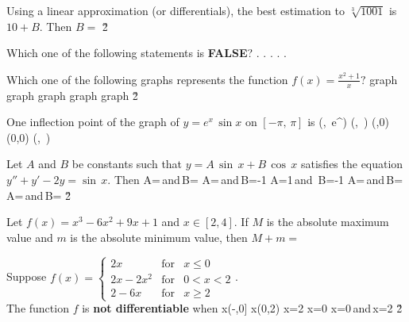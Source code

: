 \documentclass[amsfonts,bezier,leqno,fleqn,12pt,a4paper]{article}
\begin{document}
{{{\begin{large}
\newpage



\item %
Using a linear approximation (or differentials), the best estimation to $\sqrt[3]{1001}$ is $10+B.$ Then $B=$
\sc
\be
\displaystyle {}
\ee
\be
\displaystyle {}
\ee
\be
\displaystyle {}
\ee
\be
\displaystyle {}
\ee
\be
\displaystyle {}
\ee
\v2



\item %
Which one of the following statements is \textbf{FALSE}?
\sc
\be
.
\ee
\be
.
\ee
\be
.
\ee
\be
.
\ee
\be
.
\ee

\newpage



\item %
Which one of the following graphs represents the function $\displaystyle f(x)=\frac{x^{2}+1}{x}?$
\sc
\be
\mbox{graph}
\ee
\be
\mbox{graph}
\ee
\be
\mbox{graph}
\ee
\be
\mbox{graph}
\ee
\be
\mbox{graph}
\ee
\v2



\item %
One inflection point of the graph of $y=e^x\,\sin x$ on $[-\pi,\,\pi]$ is
\sc
\be
\displaystyle \left(,\, e^{}\right)
\ee
\be
\displaystyle \left(,\, \right)
\ee
\be
(\pi,0)
\ee
\be
(0,0)
\ee
\be
\displaystyle \left(,\, \right)
\ee

\newpage



\item %
Let $A$ and $B$ be constants such that $y=A\,\sin\,x+B\,\cos\,x$ satisfies the equation $y''+y'-2y=\sin\,x$. Then
\sc
\be
\displaystyle A=\,\mbox{and}\,B=
\ee
\be
\displaystyle A=\,\mbox{and}\,B=-1
\ee
\be
A=1\,\mbox{and}\, B=-1
\ee
\be
\displaystyle A=\,\mbox{and}\,B=
\ee
\be
\displaystyle A=\,\mbox{and}\,B=
\ee
\v2



\item %
Let $f(x)=x^3-6x^2+9x+1$ and $x\in[2,4].$ If $M$ is the absolute maximum value and $m$ is the absolute minimum value, then $M+m=$
\sc
{}
\ee
{}
\ee
{}
\ee
{}
\ee
{}
\ee

\newpage



\item %
Suppose $f(x)= \left\{\begin{array}{lll} 2x & \mbox{for} & x\leq 0 \\ \displaystyle 2x-2x^2 & \mbox{for} & 0 < x <2\\ 2-6x & \mbox{for} & x\geq 2 \end{array}\right.$.\\ The function $f$ is \textbf{not differentiable} when
\sc
\be
x\in(-\infty,0]
\ee
\be
x\in(0,2)
\ee
\be
x=2
\ee
\be
x=0
\ee
\be
x=0\,\mbox{and}\,x=2
\ee
\v2




\end{large}}}}
\end{document}
